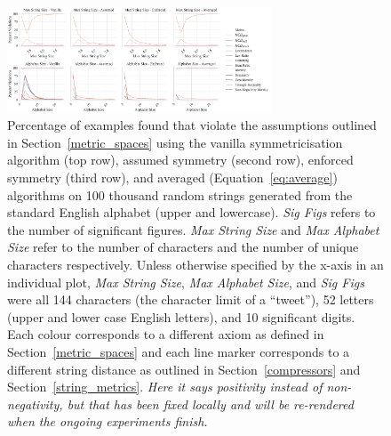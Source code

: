 \documentclass[preprint,12pt]{article}
\newcommand{\cm}[1]{\textit{{\color{blue}#1}}}
\begin{document}
\begin{figure}[h!]
    \centering
    \includegraphics[width=0.70\textwidth]{images/synthetic_check.pdf}
    \caption{
    Percentage of examples found that violate the assumptions outlined in Section~\ref{metric_spaces} using the vanilla symmetricisation algorithm (top row), assumed symmetry (second row), enforced symmetry (third row), and averaged (Equation~\ref{eq:average}) algorithms on 100 thousand random strings generated from the standard English alphabet (upper and lowercase). 
    \textit{Sig Figs} refers to the number of significant figures. \textit{Max String Size} and \textit{Max Alphabet Size} refer to the number of characters and the number of unique characters respectively. 
    Unless otherwise specified by the x-axis in an individual plot, \textit{Max String Size}, \textit{Max Alphabet Size}, and \textit{Sig Figs} were all 144 characters (the character limit of a ``tweet''), 52 letters (upper and lower case English letters), and 10 significant digits. Each colour corresponds to a different axiom as defined in Section~\ref{metric_spaces} and each line marker corresponds to a different string distance as outlined in Section~\ref{compressors} and Section~\ref{string_metrics}. \cm{Here it says positivity instead of non-negativity, but that has been fixed locally and will be re-rendered when the ongoing experiments finish.}
    }
    \label{fig:synthetic_check}
\end{figure}
\end{document}
